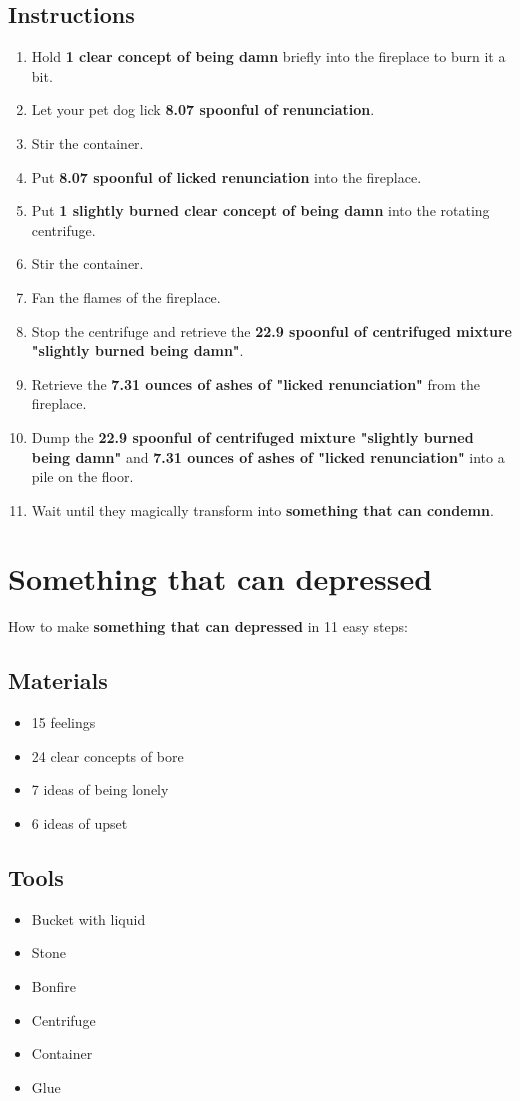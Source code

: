 \documentclass{article}
\begin{document}
\subsection{Instructions}\begin{enumerate}
\item 
Hold \textbf{1 clear concept of being damn} briefly into the fireplace to burn it a bit.
\item 
Let your pet dog lick \textbf{8.07 spoonful of renunciation}.
\item 
Stir the container.
\item 
Put \textbf{8.07 spoonful of licked renunciation} into the fireplace.
\item 
Put \textbf{1 slightly burned clear concept of being damn} into the rotating centrifuge.
\item 
Stir the container.
\item 
Fan the flames of the fireplace.
\item 
Stop the centrifuge and retrieve the \textbf{22.9 spoonful of centrifuged mixture "slightly burned being damn"}.
\item 
Retrieve the \textbf{7.31 ounces of ashes of "licked renunciation"} from the fireplace.
\item 
Dump the \textbf{22.9 spoonful of centrifuged mixture "slightly burned being damn"} and \textbf{7.31 ounces of ashes of "licked renunciation"} into a pile on the floor.
\item 
Wait until they magically transform into \textbf{something that can condemn}.
\end{enumerate}
\newpage
\section{Something that can depressed}How to make \textbf{something that can depressed} in 11 easy steps:

\subsection{Materials}\begin{itemize}
\item 
15 feelings
\item 
24 clear concepts of bore
\item 
7 ideas of being lonely
\item 
6 ideas of upset
\end{itemize}
\subsection{Tools}\begin{itemize}
\item 
Bucket with liquid
\item 
Stone
\item 
Bonfire
\item 
Centrifuge
\item 
Container
\item 
Glue
\end{itemize}
\end{document}

